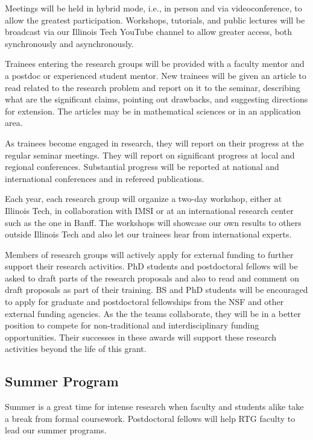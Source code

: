 \documentclass[11pt]{NSFamsart}
\begin{document}
Meetings will be held in hybrid mode, i.e., in person and via videoconference, to allow the greatest participation.  Workshops, tutorials, and public lectures will be broadcast via our Illinois Tech YouTube channel to allow greater access, both synchronously and asynchronously.

Trainees entering the research groups will be provided with a faculty mentor and a postdoc or experienced student mentor.  New trainees will be given an article to read related to the research problem and report on it to the seminar, describing what are the significant claims, pointing out drawbacks, and suggesting directions for extension. The articles may be in mathematical sciences or in an application area.

As trainees become engaged in research, they will report on their progress at the regular seminar meetings. They will report on significant progress at local and regional conferences.  Substantial progress will be reported at national and international conferences and in refereed publications.

Each year, each research group will organize a two-day workshop, either at Illinois Tech, in collaboration with IMSI or at an international research center such as the one in Banff.  The workshops will showcase our own results to others outside Illinois Tech and also let our trainees hear from international experts.

Members of research groups will actively apply for external funding to further support their research activities.  PhD students and postdoctoral fellows will be asked to draft parts of the research proposals and also to read and comment on draft proposals as part of their training.  BS and PhD students will be encouraged to apply for graduate and postdoctoral fellowships from the NSF and other external funding agencies.  As the the teams collaborate, they will be in a better position to compete for  non-traditional and interdisciplinary funding opportunities.  Their successes in these awards will support these research activities beyond the life of this grant.



\subsection{Summer Program}    \label{sec:summer}

Summer is a great time for intense research when faculty and students alike take a break from formal coursework.  Postdoctoral fellows will help RTG faculty to lead our  summer programs.
\end{document}
